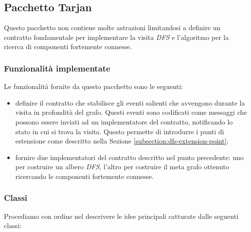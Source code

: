 \subsection{Pacchetto Tarjan}
\label{subsection:tarjan-package-description}
Questo pacchetto non contiene molte astrazioni limitandosi a definire un
contratto fondamentale per implementare la visita \emph{DFS} e
l'algoritmo per la ricerca di componenti fortemente connesse.

\subsubsection*{Funzionalit\`a implementate}
Le funzionalit\`a fornite da questo pacchetto sono le seguenti:
\begin{itemize}
\item definire il contratto che stabilisce gli eventi salienti che
  avvengono durante la visita in profondit\`a del grafo. Questi eventi
  sono codificati come messaggi che possono essere inviati ad un
  implementatore del contratto, notificando lo stato in cui si trova
  la visita. Questo permette di introdurre i punti di estensione come
  descritto nella Sezione \ref{subsection:dfs-extension-point};
\item fornire due implementatori del contratto descritto nel punto
  precedente: uno per costruire un albero \emph{DFS}, l'altro per
  costruire il meta grafo ottenuto ricercando le componenti fortemente
  connesse.
\end{itemize}

\subsubsection*{Classi}
Procediamo con ordine nel descrivere le idee principali catturate
dalle seguenti classi:

